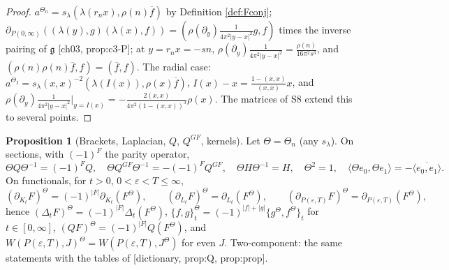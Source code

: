 \documentclass[11pt]{article}
\theoremstyle{definition}
\newtheorem{proposition}[definition]{Proposition}
\begin{document}
\begin{proof}
$a^{\Theta_n}=s_\lambda(\lambda(r_nx),\rho(n)\overline f)$ by Definition \ref{def:Fconj}; $\partial_{P(0,\infty)}((\lambda(y),g)(\lambda(x),f))=(\rho(\partial_y)\frac1{4\pi^2|y-x|^2}g,f)$ times the inverse pairing of $\mathfrak g$ [ch03, prop:c3-P]; at $y=r_nx=-sn$, $\rho(\partial_y)\frac1{4\pi^2|y-x|^2}=\frac{\rho(n)}{16\pi^2s^3}$, and $(\rho(n)\rho(n)\overline f,f)=(\overline f,f)$. The radial case: $a^{\Theta_I}=s_\lambda(x,x)^{-2}(\lambda(I(x)),\rho(x)\overline f)$, $I(x)-x=\frac{1-(x,x)}{(x,x)}x$, and $\rho(\partial_y)\frac1{4\pi^2|y-x|^2}\big|_{y=I(x)}=-\frac{2(x,x)}{4\pi^2(1-(x,x))^3}\rho(x)$. The matrices of S8 extend this to several points.
\end{proof}

\begin{proposition}[Brackets, Laplacian, $Q$, $Q^{GF}$, kernels]
\label{prop:ops}
Let $\Theta=\Theta_n$ (any $s_\lambda$). On sections, with $(-1)^F$ the parity operator,
\[
\Theta Q\Theta^{-1}=(-1)^FQ,\quad \Theta Q^{GF}\Theta^{-1}=-(-1)^FQ^{GF},\quad \Theta H\Theta^{-1}=H,\quad \Theta^2=1,\quad \langle\Theta e_0,\Theta e_1\rangle=-\overline{\langle e_0,e_1\rangle}.
\]
On functionals, for $t>0$, $0<\varepsilon<T\le\infty$,
\[
(\partial_{K_t}F)^\Theta=(-1)^{|F|}\partial_{K_t}(F^\Theta),\qquad (\partial_{L_t}F)^\Theta=\partial_{L_t}(F^\Theta),\qquad (\partial_{P(\varepsilon,T)}F)^\Theta=\partial_{P(\varepsilon,T)}(F^\Theta),
\]
hence $(\Delta_tF)^\Theta=(-1)^{|F|}\Delta_t(F^\Theta)$, $\{f,g\}_t^\Theta=(-1)^{|f|+|g|}\{g^\Theta,f^\Theta\}_t$ for $t\in[0,\infty]$, $(QF)^\Theta=(-1)^{|F|}Q(F^\Theta)$, and $W(P(\varepsilon,T),J)^\Theta=W(P(\varepsilon,T),J^\Theta)$ for even $J$. Two-component: the same statements with the tables of [dictionary, prop:Q, prop:prop].
\end{proposition}
\end{document}
